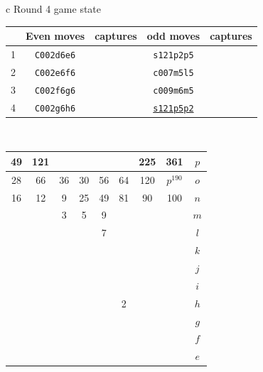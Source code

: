 \documentclass[12pt]{article}
\begin{document}
{\small{
\begin{tabular}{c}
Round 4 game state\\   
\begin{tabular}{r|cc|cc}
 & Even moves & captures   & odd moves & captures  \\    \hline 
1   &  {\tt C002d6e6} & \quad &  {\tt s121p2p5} & \quad \\
2   &  {\tt C002e6f6} & \quad &  {\tt c007m5l5} & \quad \\
3   &  {\tt C002f6g6} & \quad &  {\tt c009m6m5} & \quad \\
4   &  {\tt C002g6h6} & \quad &  \underline{\tt s121p5p2} & \quad \\
\end{tabular}
\\      
\begin{tabular}{|c|c|c|c|c|c|c|c||c} \hline
\squadfill{\,}49 & \squadfill{\,}121 & \quad & \quad & \quad & \quad & \squadfill{\,}225 & \squadfill{\,}361 & $p$ \\ \hline
\squadfill{\,}28 & \squadfill{\,}66 & \trianglepafill{\,}36 & \trianglepafill{\,}30 & \trianglepafill{\,}56 & \trianglepafill{\,}64 & \squadfill{\,}120 & \rhombusfill{\,}$p^{190}$ & $o$ \\ \hline
\trianglepafill{\,}16 & \trianglepafill{\,}12 & \circletfill{\,}9 & \circletfill{\,}25 & \circletfill{\,}49 & \circletfill{\,}81 & \trianglepafill{\,}90 & \trianglepafill{\,}100 & $n$ \\ \hline
\quad & \quad & \circletfill{\,}3 & \circletfill{\,}5 & \circletfill{\,}9 & \quad & \quad & \quad & $m$ \\ \hline
\quad & \quad & \quad & \quad & \circletfill{\,}7 & \quad & \quad & \quad & $l$ \\ \hline
\quad & \quad & \quad & \quad & \quad & \quad & \quad & \quad & $k$ \\ \hline
\quad & \quad & \quad & \quad & \quad & \quad & \quad & \quad & $j$ \\ \hline
\quad & \quad & \quad & \quad & \quad & \quad & \quad & \quad & $i$ \\ \hline
\quad & \quad & \quad & \quad & \quad & \circlet{\,}2 & \quad & \quad & $h$ \\ \hline
\quad & \quad & \quad & \quad & \quad & \quad & \quad & \quad & $g$ \\ \hline
\quad & \quad & \quad & \quad & \quad & \quad & \quad & \quad & $f$ \\ \hline
\quad & \quad & \quad & \quad & \quad & \quad & \quad & \quad & $e$ \\ \hline

\end{tabular}
\end{tabular}}}
\end{document}
